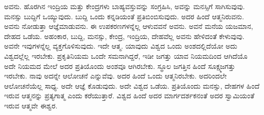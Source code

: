 ಅವನು. ಹೊರಗಿನ ಇಂದ್ರಿಯ ಮತ್ತು ಕೇಂದ್ರಗಳು ಬಾಹ್ಯವಸ್ತುವನ್ನು ಸಂಗ್ರಹಿಸಿ, ಅವನ್ನು ಮನಸ್ಸಿಗೆ ಸಾಗಿಸುವುವು. ಮನಸ್ಸು ಬುದ್ದಿಗೆ ಒಯ್ಯುವುದು. ಬುದ್ದಿ ಒಂದು ಕನ್ನಡಿಯಂತೆ ಪ್ರತಿಬಿಂಬಿಸುವುದು. ಅದರ ಹಿಂದೆ ಆತ್ಮನಿರುವನು. ಅವನು ನೋಡುತ್ತಾ ಆಜ್ಞೆಮಾಡುವನು. ಈ ಉಪಕರಣಗಳನ್ನೆಲ್ಲ ಆಳುವವನೆ ಅವನು. ಅವನೆ ಮನೆಯ ಯಜಮಾನ, ದೇಹದ ಒಡೆಯ. ಅಹಂಕಾರ, ಬುದ್ದಿ, ಮನಸ್ಸು, ಕೇಂದ್ರ, ಇಂದ್ರಿಯ, ದೇಹವೆಲ್ಲ ಅವನು ಹೇಳಿದಂತೆ ಕೇಳುವುವು. ಅವನೇ ಇವುಗಳನ್ನೆಲ್ಲ ವ್ಯಕ್ತಗೊಳಿಸುವುದು. ಇದೇ ಆತ್ಮ. ಯಾವುದು ವಿಶ್ವದ ಒಂದು ಅಂಶದಲ್ಲಿದೆಯೋ ಅದು ವಿಶ್ವದಲ್ಲೆಲ್ಲ ಇರಬೇಕು. ಪ್ರಕೃತಿನಿಯಮ ಒಂದೇ ಸಮನಾಗಿದ್ದರೆ, ಇಡೀ ಜಗತ್ತು ಯಾವ ನಿಯಮದಿಂದ ಆಗಿದೆಯೊ ಅದೇ ನಿಯಮದ ಮೇಲೆ ಅದರ ಪ್ರತಿಯೊಂದು ಅಂಶವೂ ಆಗಿರಬೇಕು. ಸ್ಥೂಲ ಜಗತ್ತಿನ ಹಿಂದೆ ಸೂಕ್ಷ್ಮಜಗತ್ತು ಇರಬೇಕು. ನಾವು ಅದನ್ನೇ ಆಲೋಚನೆ ಎನ್ನುವೆವು. ಅದರ ಹಿಂದೆ ಒಂದು ಆತ್ಮನಿರಬೇಕು. ಅದರಿಂದಲೇ ಆಲೋಚನೆಯೆಲ್ಲ ಸಾಧ್ಯ. ಅದೇ ಆಜ್ಞೆ ಕೊಡುವುದು. ಅದೇ ವಿಶ್ವದ ಒಡೆಯ. ಪ್ರತಿಯೊಂದು ಮನಸ್ಸು, ದೇಹಗಳ ಹಿಂದೆ ಇರುವ ಆತ್ಮನನ್ನು ಪ್ರತ್ಯಗಾತ್ಮ ಎಂದು ಕರೆಯುತ್ತಾರೆ. ವಿಶ್ವದ ಹಿಂದೆ ಅದರ ಮಾರ್ಗದರ್ಶಕನಂತೆ ಅದರ ಸ್ವಾಮಿಯಂತೆ ಇರುವ ಆತ್ಮವೇ ಈಶ್ವರ.

